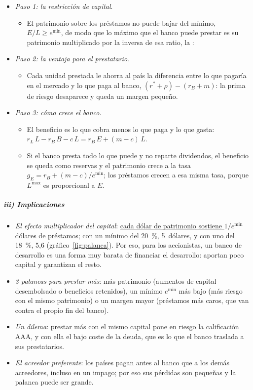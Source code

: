 \documentclass[11pt]{article}
\begin{document}
\begin{itemize}
\item \emph{Paso 1: la restricción de capital}.
  \begin{itemize}
  \item El patrimonio sobre los préstamos no puede bajar del mínimo, $E/L\geq e^{\min}$, de modo que lo máximo que el banco puede prestar es su patrimonio multiplicado por la inversa de esa ratio, la :
  \end{itemize}
\item \emph{Paso 2: la ventaja para el prestatario}.
  \begin{itemize}
  \item Cada unidad prestada le ahorra al país la diferencia entre lo que pagaría en el mercado y lo que paga al banco, $(r^*+\rho)-(r_B+m)$: la prima de riesgo desaparece y queda un margen pequeño.
  \end{itemize}
\item \emph{Paso 3: cómo crece el banco}.
  \begin{itemize}
  \item El beneficio es lo que cobra menos lo que paga y lo que gasta: $r_L\,L-r_B\,B-c\,L=r_B\,E+(m-c)\,L$.
  \item Si el banco presta todo lo que puede y no reparte dividendos, el beneficio se queda como reservas y el patrimonio crece a la tasa $g_E=r_B+(m-c)/e^{\min}$; los préstamos crecen a esa misma tasa, porque $L^{\max}$ es proporcional a $E$.
  \end{itemize}
\end{itemize}

\subparagraph{iii) Implicaciones}

\begin{itemize}
\item \emph{El efecto multiplicador del capital}: \uline{cada dólar de patrimonio sostiene $1/e^{\min}$ dólares de préstamos}; con un mínimo del 20~\%, 5~dólares, y con uno del 18~\%, 5,6 (gráfico~\ref{fig:palanca}). Por eso, para los accionistas, un banco de desarrollo es una forma muy barata de financiar el desarrollo: aportan poco capital y garantizan el resto.
\item \emph{3 palancas para prestar más}: más patrimonio (aumentos de capital desembolsado o beneficios retenidos), un mínimo $e^{\min}$ más bajo (más riesgo con el mismo patrimonio) o un margen mayor (préstamos más caros, que van contra el propio fin del banco).
\item \emph{Un dilema}: prestar más con el mismo capital pone en riesgo la calificación AAA, y con ella el bajo coste de la deuda, que es lo que el banco traslada a sus prestatarios.
\item \emph{El acreedor preferente}: los países pagan antes al banco que a los demás acreedores, incluso en un impago; por eso sus pérdidas son pequeñas y la palanca puede ser grande.
\end{itemize}
\end{document}
